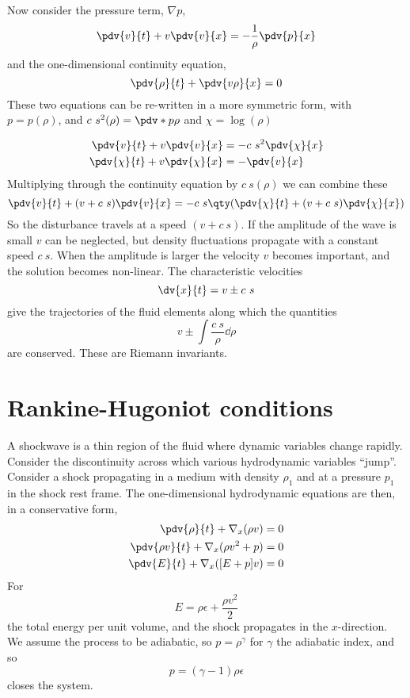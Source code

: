 Now consider the pressure term, $\nabla p$,
\[ \pdv{v}{t} + v \pdv{v}{x} = - \frac{1}{\rho} \pdv{p}{x} \]
and the one-dimensional continuity equation,
\[ \pdv{\rho}{t} + \pdv{v \rho}{x} = 0 \] These two equations can be
re-written in a more symmetric form,  with $p = p(\rho)$, and
$c~s^2(\rho) = \pdv*{p}{\rho}$ and $\chi = \log(\rho)$

\begin{subequations}
  \begin{align}
    \pdv{v}{t} + v \pdv{v}{x} &= - c~s^2 \pdv{\chi}{x} \\ 
\pdv{\chi}{t} + v \pdv{\chi}{x} &= - \pdv{v}{x}
  \end{align}
\end{subequations}
Multiplying through the continuity equation by $c~s(\rho)$ we can
combine these
\begin{equation}
  \label{eq:63}
  \pdv{v}{t} + (v+c~s) \pdv{v}{x} = - c~s \qty( \pdv{\chi}{t} + (v + c~s) \pdv{\chi}{x})
\end{equation}
So the disturbance travels at a speed $(v+c~s)$. If the amplitude of
the wave is small $v$ can be neglected, but density fluctuations
propagate with a constant speed $c~s$. When the amplitude is larger
the velocity $v$ becomes important, and the solution becomes
non-linear. The characteristic velocities
\[ \dv{x}{t} = v \pm c~s \]
give the trajectories of the fluid elements along which the quantities 
\[ v \pm \int \frac{c~s}{\rho} \dd{\rho} \] are conserved. These are
Riemann invariants.

\section{Rankine-Hugoniot conditions}
\label{sec:jump-cond-envel}

A shockwave is a thin region of the fluid where dynamic variables
change rapidly. Consider the discontinuity across which various
hydrodynamic variables ``jump''.
Consider a shock propagating in a medium with density $\rho_1$ and at
a pressure $p_1$ in the shock rest frame. The one-dimensional
hydrodynamic equations are then, in a conservative form,
\begin{subequations}
  \begin{align}
    \pdv{\rho}{t} + \nabla_x (\rho v) &= 0\\
\pdv{\rho v}{t} + \nabla_x(\rho v^2 + p) &= 0\\
\pdv{E}{t} + \nabla_x ([E+p]v)&=0
  \end{align}
\end{subequations}
For \[E = \rho \epsilon + \frac{\rho v^2}{2} \] the total energy per
unit volume, and the shock propagates in the $x$-direction. We assume
the process to be adiabatic, so $p = \rho^{\gamma}$ for $\gamma$ the
adiabatic index, and so
\[ p = (\gamma-1) \rho \epsilon \]
closes the system.


